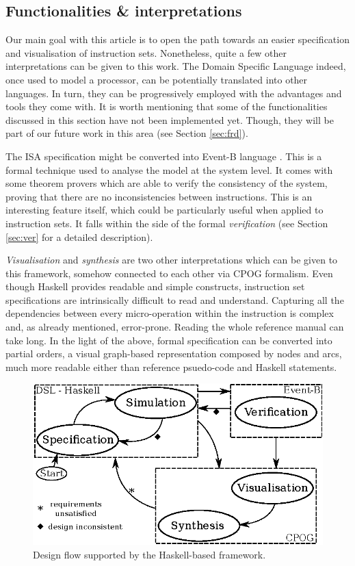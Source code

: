 \documentclass[conference]{IEEEtran}
\begin{document}
\subsection{Functionalities \& interpretations}
\label{sec:func}
Our main goal with this article is to open the path towards an easier specification and
visualisation of instruction sets. Nonetheless, quite a few other interpretations can be
given to this work. The Domain Specific Language indeed, once used to model
a processor, can be potentially translated into other languages. In turn, they
can be progressively employed with the advantages and tools they come with. It is worth
mentioning that some of the functionalities discussed in this section have not been
implemented yet. Though, they will be part of our future work in this area (see Section
\ref{sec:frd}).

The ISA specification might be converted into Event-B language \cite{eventB}. This is a
formal technique used to analyse the model at the system level. It comes with some theorem
provers which are able to verify the consistency of the system, proving that there are 
no inconsistencies between instructions. This is an interesting feature itself, which could
be particularly useful when applied to instruction sets. It falls within the side of the
formal \textit{verification} (see Section \ref{sec:ver} for a detailed description).

\textit{Visualisation} and \textit{synthesis} are two other
interpretations which can be given to this framework, somehow connected to each other via
CPOG formalism. Even though Haskell provides readable and simple constructs, instruction
set specifications are intrinsically difficult to read and understand.
Capturing all the dependencies between every micro-operation within the instruction is
complex and, as already mentioned, error-prone. Reading the whole reference manual can take
long. In the light of the above, formal specification can be converted into partial orders,
a visual graph-based representation composed by nodes and arcs, much more readable either
than reference psuedo-code and Haskell statements.

\begin{figure}[ht!]
\begin{center}
	\includegraphics[width=\linewidth]{IMG/flow.eps}
	\caption{Design flow supported by the Haskell-based framework.}
	\label{fig:flow}
\end{center}
\end{figure}
\end{document}

